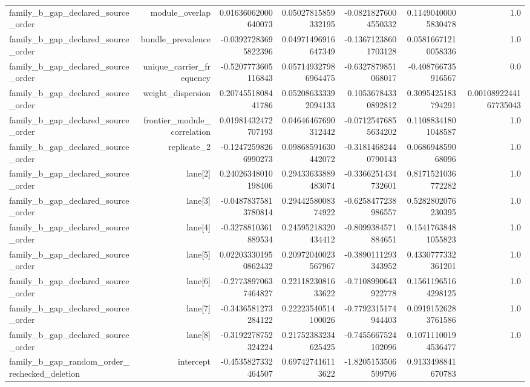 {\begin{longtable}{lrrrrrr}
family\_b\_gap\_declared\_source\_order & module\_overlap & 0.01636062000640073 & 0.05027815859332195 & -0.08218276004550332 & 0.11490400005830478 & 1.0 \\
family\_b\_gap\_declared\_source\_order & bundle\_prevalence & -0.03927283695822396 & 0.04971496916647349 & -0.13671238601703128 & 0.05816671210058336 & 1.0 \\
family\_b\_gap\_declared\_source\_order & unique\_carrier\_frequency & -0.5207773605116843 & 0.057149327986964475 & -0.6327879851068017 & -0.408766735916567 & 0.0 \\
family\_b\_gap\_declared\_source\_order & weight\_dispersion & 0.2074551808441786 & 0.052086333392094133 & 0.10536784330892812 & 0.3095425183794291 & 0.0010892244167735043 \\
family\_b\_gap\_declared\_source\_order & frontier\_module\_correlation & 0.01981432472707193 & 0.04646467690312442 & -0.07125476855634202 & 0.11088341801048587 & 1.0 \\
family\_b\_gap\_declared\_source\_order & replicate\_2 & -0.12472598266990273 & 0.09868591630442072 & -0.31814682440790143 & 0.068694859068096 & 1.0 \\
family\_b\_gap\_declared\_source\_order & lane[2] & 0.24026348010198406 & 0.29433633889483074 & -0.3366251434732601 & 0.8171521036772282 & 1.0 \\
family\_b\_gap\_declared\_source\_order & lane[3] & -0.04878375813780814 & 0.2944258008374922 & -0.6258477238986557 & 0.5282802076230395 & 1.0 \\
family\_b\_gap\_declared\_source\_order & lane[4] & -0.3278810361889534 & 0.24595218320434412 & -0.8099384571884651 & 0.15417638481055823 & 1.0 \\
family\_b\_gap\_declared\_source\_order & lane[5] & 0.022033301950862432 & 0.20972040023567967 & -0.3890111293343952 & 0.4330777332361201 & 1.0 \\
family\_b\_gap\_declared\_source\_order & lane[6] & -0.27738970637464827 & 0.2211823081633622 & -0.7108990643922778 & 0.15611965164298125 & 1.0 \\
family\_b\_gap\_declared\_source\_order & lane[7] & -0.3436581273284122 & 0.22223540514100026 & -0.7792315174944403 & 0.09191526283761586 & 1.0 \\
family\_b\_gap\_declared\_source\_order & lane[8] & -0.3192278752324224 & 0.21752383234625425 & -0.7455667524102096 & 0.10711100194536477 & 1.0 \\
family\_b\_gap\_random\_order\_rechecked\_deletion & intercept & -0.4535827332464507 & 0.697427416113622 & -1.8205153506599796 & 0.9133498841670783 &  \\

\end{longtable}}

